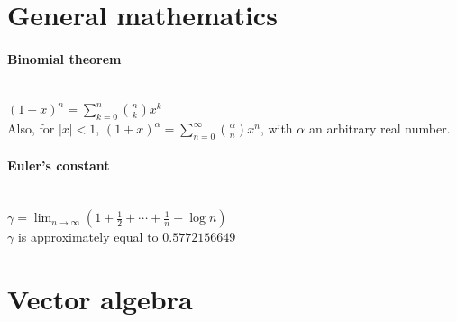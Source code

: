 \documentclass[10pt]{article}
\begin{document}
\bigskip\bigskip
\section{General mathematics}\smallskip

\paragraph{Binomial theorem}\ \\
$(1+x)^n=\sum_{k=0}^n\binom{n}{k}x^k$\\
Also, for $|x|<1$, $(1+x)^\alpha=\sum_{n=0}^\infty\binom{\alpha}{n}x^n$, with $\alpha$ an arbitrary real number.

\paragraph{Euler's constant}\ \\
$\gamma = \lim_{n\to\infty}\left(1+\frac{1}{2}+\cdots+\frac{1}{n} - \log n \right)$\\
$\gamma$ is approximately equal to $0.5772156649$



\bigskip\bigskip
\section{Vector algebra}\smallskip
\end{document}
